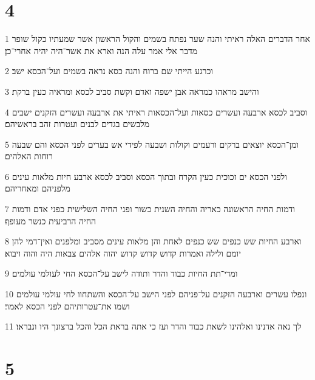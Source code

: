 \chapter{4}

\par 1 אחר הדברים האלה ראיתי והנה שער נפתח בשמים והקול הראשון אשר שמעתיו כקול שופר מדבר אלי אמר עלה הנה וארא את אשר־היה יהיה אחרי־כן׃
\par 2 וכרגע הייתי שם ברוח והנה כסא נראה בשמים ועל־הכסא ישב׃
\par 3 והישב מראהו כמראה אבן ישפה ואדם וקשת סביב לכסא ומראיה כעין ברקת׃
\par 4 וסביב לכסא ארבעה ועשרים כסאות ועל־הכסאות ראיתי את ארבעה ועשרים הזקנים ישבים מלבשים בגדים לבנים ועטרות זהב בראשיהם׃
\par 5 ומן־הכסא יוצאים ברקים ורעמים וקולות ושבעה לפידי אש בערים לפני הכסא והם שבעה רוחות האלהים׃
\par 6 ולפני הכסא ים זכוכית כעין הקרח ובתוך הכסא וסביב לכסא ארבע חיות מלאות עינים מלפניהם ומאחריהם׃
\par 7 ודמות החיה הראשונה כאריה והחיה השנית כשור ופני החיה השלישית כפני אדם ודמות החיה הרביעית כנשר מעופף׃
\par 8 וארבע החיות שש כנפים שש כנפים לאחת והן מלאות עינים מסביב ומלפנים ואין־דמי להן יומם ולילה ואמרות קדוש קדוש קדוש יהוה אלהים צבאות היה והוה ויבוא׃
\par 9 ומדי־תת החיות כבוד והדר ותודה לישב על־הכסא החי לעולמי עולמים׃
\par 10 ונפלו עשרים וארבעה הזקנים על־פניהם לפני הישב על־הכסא והשתחוו לחי עולמי עולמים ושמו את־עטרותיהם לפני הכסא לאמר׃
\par 11 לך נאה אדנינו ואלהינו לשאת כבוד והדר ועז כי אתה בראת הכל והכל ברצונך היו ונבראו׃

\chapter{5}

